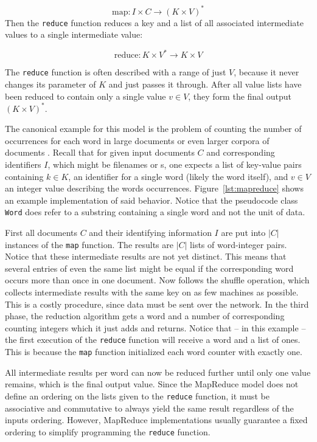 \[\text{map}:I\times{}C \rightarrow{} (K\times{}V)^*\]
Then the \lstinline|reduce| function reduces a key and a list of all associated intermediate values to a single intermediate value:

\[\text{reduce}: K\times{}V^*\rightarrow{}K\times{}V\]

The \lstinline|reduce| function is often described with a range of just $V$, because it never changes its parameter of $K$ and just passes it through. After all value lists have been reduced to contain only a single value $v\in{}V$, they form the final output $(K\times{}V)^*$.

The canonical example for this model is the problem of counting the number of occurrences for each word in large documents or even larger corpora of documents \cite{dean2008mapreduce}. Recall that for given input documents $C$ and corresponding identifiers $I$, which might be filenames or \URL{}s, one expects a list of key-value pairs containing $k\in{}K$, an identifier for a single word (likely the word itself), and $v\in{}V$ an integer value describing the words occurrences. Figure~\ref{lst:mapreduce} shows an example implementation of said behavior. Notice that the pseudocode class \lstinline|Word| does refer to a substring containing a single word and not the unit of data.

First all documents $C$ and their identifying information $I$ are put into $|C|$ instances of the \lstinline|map| function. The results are $|C|$ lists of word-integer pairs. Notice that these intermediate results are not yet distinct. This means that several entries of even the same list might be equal if the corresponding word occurs more than once in one document. Now follows the shuffle operation, which collects intermediate results with the same key on as few machines as possible. This is a costly procedure, since data must be sent over the network. In the third phase, the reduction algorithm gets a word and a number of corresponding counting integers which it just adds and returns. Notice that -- in this example -- the first execution of the \lstinline|reduce| function will receive a word and a list of ones. This is because the \lstinline|map| function initialized each word counter with exactly one.

All intermediate results per word can now be reduced further until only one value remains, which is the final output value. Since the MapReduce model does not define an ordering on the lists given to the \lstinline|reduce| function, it must be associative and commutative to always yield the same result regardless of the inputs ordering. However, MapReduce implementations usually guarantee a fixed ordering to simplify programming the \lstinline|reduce| function.

